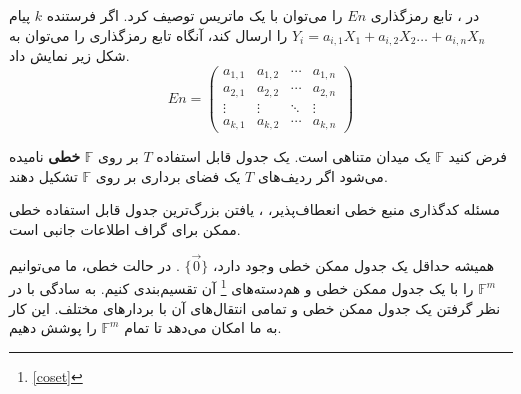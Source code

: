 \begin{note}
    در 
    \lpicod
    ، تابع رمزگذاری 
    $En$
         را می‌توان با یک ماتریس توصیف کرد. اگر فرستنده
    $k$ 
    پیام
     $Y_i = a_{i,1} X_1 + a_{i,2} X_2 \ldots + a_{i,n} X_n$
      را ارسال کند، آنگاه تابع رمزگذاری را می‌توان به شکل زیر نمایش داد.
    \begin{equation*}
        En =
        \begin{pmatrix}
            a_{1,1} & a_{1,2} & \cdots & a_{1,n} \\
            a_{2,1} & a_{2,2} & \cdots & a_{2,n} \\
            \vdots  & \vdots  & \ddots & \vdots  \\
            a_{k,1} & a_{k,2} & \cdots & a_{k,n}
        \end{pmatrix}
    \end{equation*}
\end{note}

\begin{definition}
	\label{def:lineartable}
    فرض کنید 
    $\mathbb{F}$
     یک میدان متناهی است. یک جدول قابل استفاده 
     $T$ 
     بر روی 
     $\mathbb{F}$
      \textbf{
      خطی
    }
       نامیده می‌شود اگر ردیف‌های 
      $T$ 
      یک فضای برداری بر روی 
      $\mathbb{F}$
       تشکیل دهند.
\end{definition}

مسئله کدگذاری منبع خطی انعطاف‌پذیر، 
\lpsicod
، یافتن بزرگ‌ترین جدول قابل استفاده خطی ممکن برای گراف اطلاعات جانبی است.

\begin{remark}
    همیشه حداقل یک جدول ممکن خطی وجود دارد، 
    $\{\overrightarrow{0}\}$
    . در حالت خطی، ما می‌توانیم 
    $\mathbb{F}^m$
     را با یک جدول ممکن خطی و 
     هم‌دسته‌های
     \footnote{\autoref{coset}}
      آن تقسیم‌بندی کنیم. به سادگی با در نظر گرفتن یک جدول ممکن خطی و تمامی انتقال‌های  آن با بردارهای مختلف. این کار به ما امکان می‌دهد تا تمام 
     $\mathbb{F}^m$
      را پوشش دهیم.
\end{remark}

